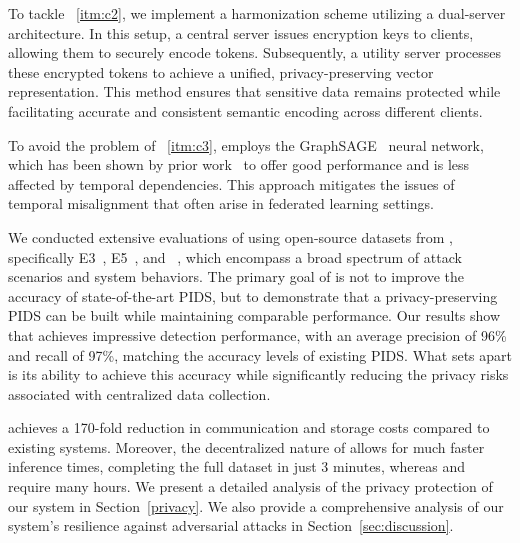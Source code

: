 To tackle ~\ref{itm:c2}, we implement a \wordvec harmonization scheme utilizing a dual-server architecture. In this setup, a central server issues encryption keys to clients, allowing them to securely encode \wordvec tokens. Subsequently, a utility server processes these encrypted tokens to achieve a unified, privacy-preserving vector representation. This method ensures that sensitive data remains protected while facilitating accurate and consistent semantic encoding across different clients.

To avoid the problem of ~\ref{itm:c3}, \Sys employs the GraphSAGE~\cite{hamilton2017inductive} neural network, which has been shown by prior work~\cite{flash2024,shadewatcher,wang2022threatrace} to offer good performance and is less affected by temporal dependencies. This approach mitigates the issues of temporal misalignment that often arise in federated learning settings.





We conducted extensive evaluations of \Sys using open-source datasets from \darpa, specifically E3~\cite{error3}, E5~\cite{bug5}, and \optc~\cite{anjum2021analyzing}, which encompass a broad spectrum of attack scenarios and system behaviors. The primary goal of \Sys is not to improve the accuracy of state-of-the-art PIDS, but to demonstrate that a privacy-preserving PIDS can be built while maintaining comparable performance. Our results show that \Sys achieves impressive detection performance, with an average precision of 96\% and recall of 97\%, matching the accuracy levels of existing PIDS. What sets \Sys apart is its ability to achieve this accuracy while significantly reducing the privacy risks associated with centralized data collection.

\Sys achieves a 170-fold reduction in communication and storage costs compared to existing systems. Moreover, the decentralized nature of \Sys allows for much faster inference times, completing the full \optc dataset in just 3 minutes, whereas \flash and \kairos require many hours. We present a detailed analysis of the privacy protection of our system in Section~\ref{privacy}. We also provide a comprehensive analysis of our system's resilience against adversarial attacks in Section~\ref{sec:discussion}. 


